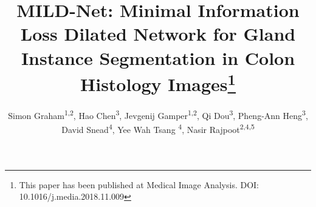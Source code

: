 \documentclass[3p]{elsarticle}
\begin{document}
\begin{frontmatter}



\title{MILD-Net: Minimal Information Loss Dilated Network for Gland Instance Segmentation in Colon Histology Images\footnote[1]{This paper has been published at Medical Image Analysis. DOI: 10.1016/j.media.2018.11.009}}






\author{Simon Graham\textsuperscript{1,2}, Hao Chen\textsuperscript{3}, Jevgenij Gamper\textsuperscript{1,2}, Qi Dou\textsuperscript{3}, Pheng-Ann Heng\textsuperscript{3}, David Snead\textsuperscript{4}, Yee Wah Tsang \textsuperscript{4}, Nasir Rajpoot\textsuperscript{2,4,5}}

\address{\textsuperscript{1}Mathematics for Real World Systems Centre for Doctoral Training, University of Warwick, UK \\
\textsuperscript{2}Department of Computer Science, University of Warwick, UK \\
\textsuperscript{3}Department of Computer Science and Engineering, The Chinese University of Hong Kong, China \\
\textsuperscript{4}Department of Pathology, University Hospitals Coventry and Warwickshire, Coventry, UK \\
\textsuperscript{5}The Alan Turing Institute, London, UK}

\begin{abstract}



\end{abstract}
\end{frontmatter}
\end{document}
